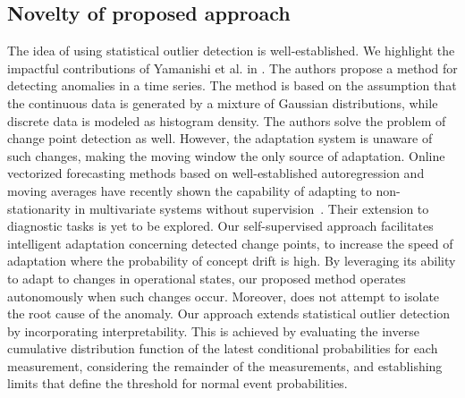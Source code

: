 \subsection{Novelty of proposed approach}
The idea of using statistical outlier detection is well-established. We highlight the impactful contributions of Yamanishi et al. in \citep{Yamanishi2002, Yamanishi2004}. The authors propose a method for detecting anomalies in a time series. The method is based on the assumption that the continuous data is generated by a mixture of Gaussian distributions, while discrete data is modeled as histogram density. The authors solve the problem of change point detection as well. However, the adaptation system is unaware of such changes, making the moving window the only source of adaptation. Online vectorized forecasting methods based on well-established autoregression and moving averages have recently shown the capability of adapting to non-stationarity in multivariate systems without supervision~\citet{Melnyk2016, Zhang2023}. Their extension to diagnostic tasks is yet to be explored. Our self-supervised approach facilitates intelligent adaptation concerning detected change points, to increase the speed of adaptation where the probability of concept drift is high. By leveraging its ability to adapt to changes in operational states, our proposed method operates autonomously when such changes occur. Moreover, \citet{Yamanishi2004} does not attempt to isolate the root cause of the anomaly. Our approach extends statistical outlier detection by incorporating interpretability. This is achieved by evaluating the inverse cumulative distribution function of the latest conditional probabilities for each measurement, considering the remainder of the measurements, and establishing limits that define the threshold for normal event probabilities.

